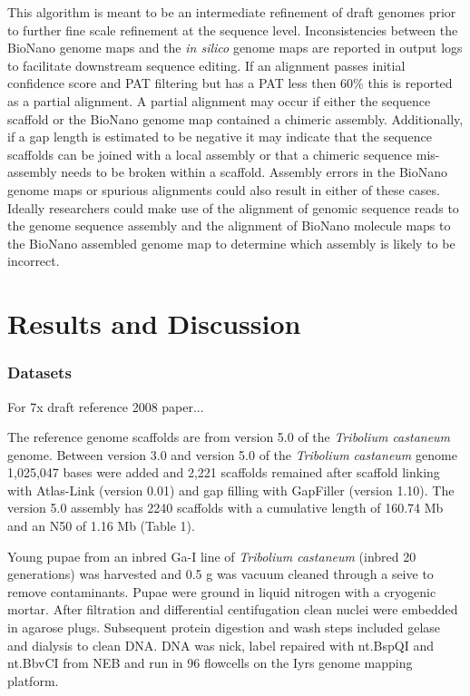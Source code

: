 \documentclass{bmcart}
\begin{document}
This algorithm is meant to be an intermediate refinement of draft genomes prior to further fine scale refinement at the sequence level. Inconsistencies between the BioNano genome maps and the \textit{in silico} genome maps are reported in output logs to facilitate downstream sequence editing. If an alignment passes initial confidence score and PAT filtering but has a PAT less then 60\% this is reported as a partial alignment. A partial alignment may occur if either the sequence scaffold or the BioNano genome map contained a chimeric assembly. Additionally, if a gap length is estimated to be negative it may indicate that the sequence scaffolds can be joined with a local assembly or that a chimeric sequence mis-assembly needs to be broken within a scaffold. Assembly errors in the BioNano genome maps or spurious alignments could also result in either of these cases. Ideally researchers could make use of the alignment of genomic sequence reads to the genome sequence assembly and the alignment of BioNano molecule maps to the BioNano assembled genome map to determine which assembly is likely to be incorrect.
 
\section*{Results and Discussion}

\subsubsection*{Datasets}

For 7x draft reference 2008 paper...

The reference genome scaffolds are from version 5.0 of the \textit{Tribolium castaneum} genome. Between version 3.0 and version 5.0 of the \textit{Tribolium castaneum} genome 1,025,047 bases were added and 2,221 scaffolds remained after scaffold linking with Atlas-Link (version 0.01) and gap filling with GapFiller (version 1.10). The version 5.0 assembly has 2240 scaffolds with a cumulative length of 160.74 Mb and an N50 of 1.16 Mb (Table 1).

Young pupae from an inbred Ga-I line of \textit{Tribolium castaneum} (inbred 20 generations) was harvested and 0.5 g was vacuum cleaned through a seive to remove contaminants. Pupae were ground in liquid nitrogen with a cryogenic mortar. After filtration and differential centifugation clean nuclei were embedded in agarose plugs. Subsequent protein digestion and wash steps included gelase and dialysis to clean DNA. DNA was nick, label repaired with nt.BspQI and nt.BbvCI from NEB and run in 96 flowcells on the Iyrs genome mapping platform. 
\end{document}
